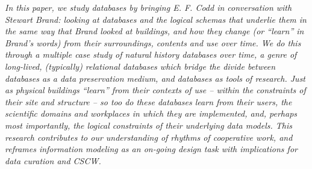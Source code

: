 \textit{In this paper, we study databases by bringing E. F. Codd in conversation with Stewart Brand: looking at databases and the logical schemas that underlie them in the same way that Brand looked at buildings, and how they change (or “learn” in Brand’s words) from their surroundings, contents and use over time.  We do this through a multiple case study of natural history databases over time, a genre of long-lived, (typically) relational databases which bridge the divide between databases as a data preservation medium, and databases as tools of research.  Just as physical buildings “learn” from their contexts of use – within the constraints of their site and structure – so too do these databases learn from their users, the scientific domains and workplaces in which they are implemented, and, perhaps most importantly, the logical constraints of their underlying data models.  This research contributes to our understanding of rhythms of cooperative work, and reframes information modeling as an on-going design task with implications for data curation and CSCW.}